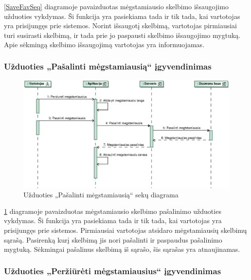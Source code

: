 \documentclass[12pt]{article}
\begin{document}
	\ref{SaveFavSeq} diagramoje pavaizduotas mėgstamiausio skelbimo išsaugojimo užduoties vykdymas. Ši funkcija yra pasiekiama tada ir tik tada, kai vartotojas yra prisijungęs prie sistemos. Norint išsaugotį skelbimą, vartotojas pirmiausiai turi susirasti skelbimą, ir tada prie jo paspausti skelbimo išsaugojimo mygtuką. Apie sėkmingą skelbimo išsaugojimą vartotojas yra informuojamas.
	\pagebreak
	
	\subsubsection{Užduoties „Pašalinti mėgstamiausią“ įgyvendinimas}
	
	\begin{figure}[h]
		\begin{center}
			\includegraphics[width=\textwidth]{PasalintiMegstamiausia.eps}
			\caption{Užduoties „Pašalinti mėgstamiausią“ sekų diagrama\label{DelFavSeq}}
		\end{center}
	\end{figure}
	
	\ref{DelFavSeq} diagramoje pavaizduotas mėgstamiausio skelbimo pašalinimo užduoties vykdymas. Ši funkcija yra pasiekiama tada ir tik tada, kai vartotojas yra prisijungęs prie sistemos. Pirmiausiai vartotojas atsidaro mėgstamiausių skelbimų sąrašą. Pasirenką kurį skelbimą jis nori pašalinti ir paspaudus pašalinimo mygtuką. Sėkmingai pašalinus skelbimą iš sąrašo, šis sąrašas yra atnaujinamas.
	\pagebreak
	
	\subsubsection{Užduoties „Peržiūrėti mėgstamiausius“ įgyvendinimas}
	
\end{document}
